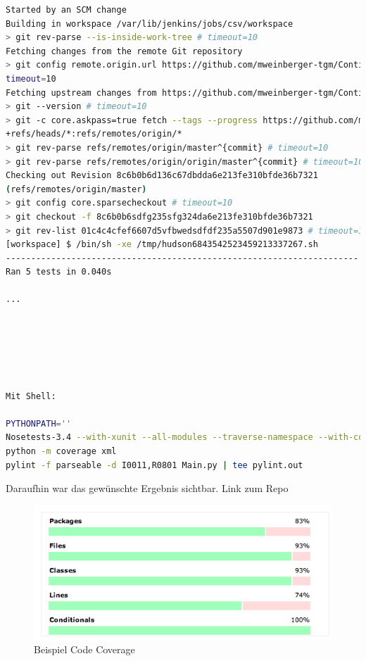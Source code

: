 \documentclass[letterpaper, 12pt]{article}
\begin{document}
\begin{lstlisting}[frame=single,language=bash, caption=Build \#1]
Started by an SCM change
Building in workspace /var/lib/jenkins/jobs/csv/workspace
> git rev-parse --is-inside-work-tree # timeout=10
Fetching changes from the remote Git repository
> git config remote.origin.url https://github.com/mweinberger-tgm/Continuous-Integration.git #
timeout=10
Fetching upstream changes from https://github.com/mweinberger-tgm/Continuous-Integration.git
> git --version # timeout=10
> git -c core.askpass=true fetch --tags --progress https://github.com/mweinberger-tgm/Continuous-Integration.git
+refs/heads/*:refs/remotes/origin/*
> git rev-parse refs/remotes/origin/master^{commit} # timeout=10
> git rev-parse refs/remotes/origin/origin/master^{commit} # timeout=10
Checking out Revision 8c6b0b6d136c67dbdda6e213fe310bfde36b7321
(refs/remotes/origin/master)
> git config core.sparsecheckout # timeout=10
> git checkout -f 8c6b0b6sdfg235sfg324da6e213fe310bfde36b7321
> git rev-list 01c4c4cfef6607d5vfbwedsdfdf235a5507d901e9873 # timeout=10
[workspace] $ /bin/sh -xe /tmp/hudson6843542523459213337267.sh
----------------------------------------------------------------------
Ran 5 tests in 0.040s

...






Mit Shell:

PYTHONPATH=''
Nosetests-3.4 --with-xunit --all-modules --traverse-namespace --with-coverage --cover-package=CSVimportPython --cover-inclusive
python -m coverage xml
pylint -f parseable -d I0011,R0801 Main.py | tee pylint.out

\end{lstlisting}

Daraufhin war das gewünschte Ergebnis sichtbar. Link zum Repo \cite{repo}

\begin{figure}[!h]
	\begin{center}
		\includegraphics[width=0.7\linewidth]{images/coverage}
		\caption{Beispiel Code Coverage}
		\label{Beispiel Code Coverage}
	\end{center}
\end{figure}
\end{document}
